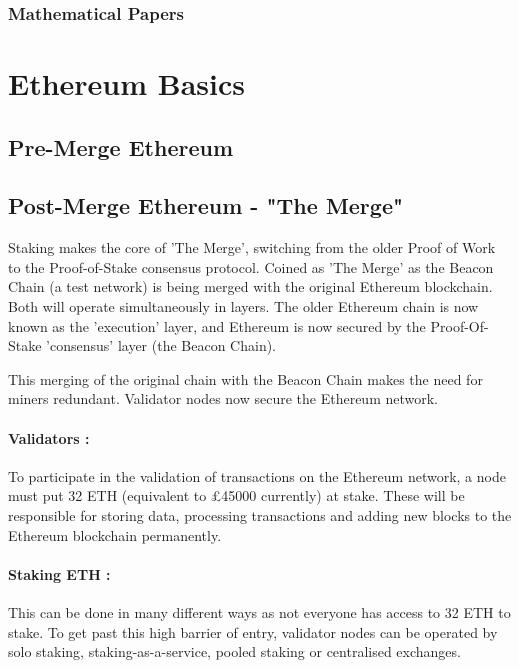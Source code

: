 
\subsubsection{Mathematical Papers}



\section{Ethereum Basics}



\subsection{Pre-Merge Ethereum}

\subsection{Post-Merge Ethereum - "The Merge"}

Staking makes the core of 'The Merge', switching from the older Proof of Work to the Proof-of-Stake consensus protocol. Coined as 'The Merge' as the Beacon Chain (a test network) is being merged with the original Ethereum blockchain. Both will operate simultaneously in layers. The older Ethereum chain is now known as the 'execution' layer, and Ethereum is now secured by the Proof-Of-Stake 'consensus' layer (the Beacon Chain). 

This merging of the original chain with the Beacon Chain makes the need for miners redundant. Validator nodes now secure the Ethereum network. 

\paragraph{Validators :}
To participate in the validation of transactions on the Ethereum network, a node must put 32 ETH (equivalent to £45000 currently) at stake. These will be responsible for storing data, processing transactions and adding new blocks to the Ethereum blockchain permanently. 

\paragraph{Staking ETH :}
This can be done in many different ways as not everyone has access to 32 ETH to stake. To get past this high barrier of entry, validator nodes can be operated by solo staking, staking-as-a-service, pooled staking or centralised exchanges.

